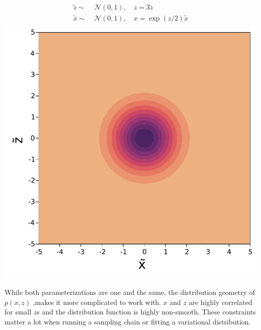 \begin{minipage}{0.5\textwidth}
    \centering
    \begin{align}
        \begin{aligned}
            \tilde{z} \sim&\; \mathcal{N}(0, 1),\quad z = 3\tilde{z}\\
            \tilde{x} \sim&\; \mathcal{N}(0, 1),\quad x = \exp(z/2)\tilde{x}
        \end{aligned}
    \end{align}
    \includegraphics[width=\textwidth]{./chapters/1_introduction/figures/neals_funnel_non_centered.pdf}
    \label{fig:neals_noncentered}
\end{minipage}
\vspace{0.5cm}

While both parameterizations are one and the same, the distribution geometry of $p(x,z)$ ,makes it more complicated to work with.
$x$ and $z$ are highly correlated for small $z$s and the distribution function is highly non-smooth.
These constraints matter a lot when running a sampling chain or fitting a variational distribution.

